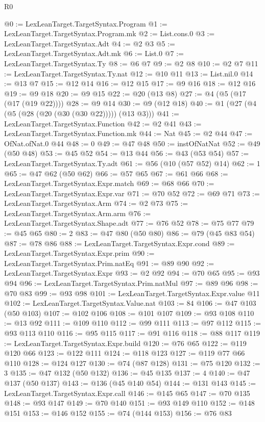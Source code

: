 \begin{lexlean}{R0}
\begin{coremodule}
@0 := LexLeanTarget.TargetSyntax.Program
@1 := LexLeanTarget.TargetSyntax.Program.mk
@2 := List.cons.{0}
@3 := LexLeanTarget.TargetSyntax.Adt
@4 := @2 @3
@5 := LexLeanTarget.TargetSyntax.Adt.mk
@6 := List.{0}
@7 := LexLeanTarget.TargetSyntax.Ty
@8 := @6 @7
@9 := @2 @8
@10 := @2 @7
@11 := LexLeanTarget.TargetSyntax.Ty.nat
@12 := @10 @11
@13 := List.nil.{0}
@14 := @13 @7
@15 := @12 @14
@16 := @12 @15
@17 := @9 @16
@18 := @12 @16
@19 := @9 @18
@20 := @9 @15
@22 := @20 (@13 @8)
@27 := @4 (@5 (@17 (@17 (@19 @22))))
@28 := @9 @14
@30 := @9 (@12 @18)
@40 := @1 (@27 (@4 (@5 (@28 (@20 (@30 (@30 @22))))) (@13 @3)))
@41 := LexLeanTarget.TargetSyntax.Function
@42 := @2 @41
@43 := LexLeanTarget.TargetSyntax.Function.mk
@44 := Nat
@45 := @2 @44
@47 := OfNat.ofNat.{0} @44
@48 := 0
@49 := @47 @48
@50 := instOfNatNat
@52 := @49 (@50 @48)
@53 := @45 @52
@54 := @13 @44
@56 := @43 (@53 @54)
@57 := LexLeanTarget.TargetSyntax.Ty.adt
@61 := @56 (@10 (@57 @52) @14)
@62 := 1
@65 := @47 @62 (@50 @62)
@66 := @57 @65
@67 := @61 @66
@68 := LexLeanTarget.TargetSyntax.Expr.match
@69 := @68 @66
@70 := LexLeanTarget.TargetSyntax.Expr.var
@71 := @70 @52
@72 := @69 @71
@73 := LexLeanTarget.TargetSyntax.Arm
@74 := @2 @73
@75 := LexLeanTarget.TargetSyntax.Arm.arm
@76 := LexLeanTarget.TargetSyntax.Shape.adt
@77 := @76 @52
@78 := @75 @77
@79 := @45 @65
@80 := 2
@83 := @47 @80 (@50 @80)
@86 := @79 (@45 @83 @54)
@87 := @78 @86
@88 := LexLeanTarget.TargetSyntax.Expr.cond
@89 := LexLeanTarget.TargetSyntax.Expr.prim
@90 := LexLeanTarget.TargetSyntax.Prim.natEq
@91 := @89 @90
@92 := LexLeanTarget.TargetSyntax.Expr
@93 := @2 @92
@94 := @70 @65
@95 := @93 @94
@96 := LexLeanTarget.TargetSyntax.Prim.natMul
@97 := @89 @96
@98 := @70 @83
@99 := @93 @98
@101 := LexLeanTarget.TargetSyntax.Expr.value @11
@102 := LexLeanTarget.TargetSyntax.Value.nat
@103 := 84
@106 := @47 @103 (@50 @103)
@107 := @102 @106
@108 := @101 @107
@109 := @93 @108
@110 := @13 @92
@111 := @109 @110
@112 := @99 @111
@113 := @97 @112
@115 := @93 @113 @110
@116 := @95 @115
@117 := @91 @116
@118 := @88 @117
@119 := LexLeanTarget.TargetSyntax.Expr.build
@120 := @76 @65
@122 := @119 @120 @66
@123 := @122 @111
@124 := @118 @123
@127 := @119 @77 @66 @110
@128 := @124 @127
@130 := @74 (@87 @128)
@131 := @75 @120
@132 := 3
@135 := @47 @132 (@50 @132)
@136 := @45 @135
@137 := 4
@140 := @47 @137 (@50 @137)
@143 := @136 (@45 @140 @54)
@144 := @131 @143
@145 := LexLeanTarget.TargetSyntax.Expr.call
@146 := @145 @65
@147 := @70 @135
@148 := @93 @147
@149 := @70 @140
@151 := @93 @149 @110
@152 := @148 @151
@153 := @146 @152
@155 := @74 (@144 @153)
@156 := @76 @83

\end{coremodule}
\end{lexlean}
